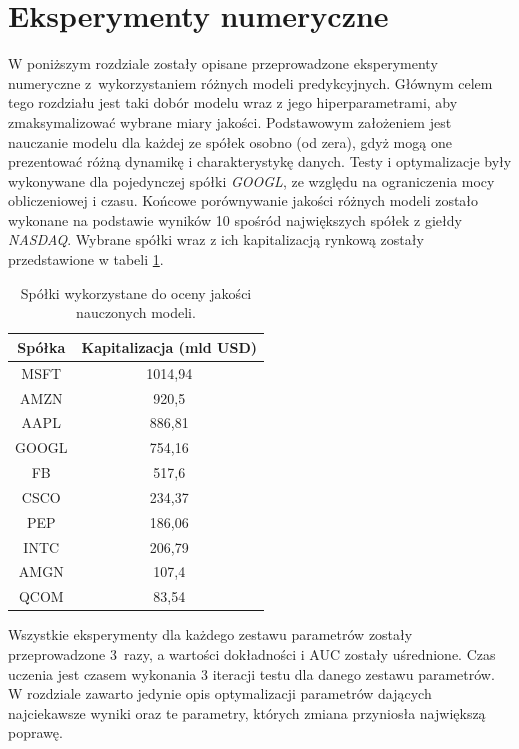 \documentclass[a4paper, twoside, 11pt, openright]{article}
\begin{document}
\bigskip

\newpage

\section{Eksperymenty numeryczne}

W poniższym rozdziale zostały opisane przeprowadzone eksperymenty numeryczne z~wykorzystaniem różnych modeli predykcyjnych. Głównym celem tego rozdziału jest taki dobór modelu wraz z jego hiperparametrami, aby zmaksymalizować wybrane miary jakości. Podstawowym założeniem jest nauczanie modelu dla każdej ze spółek osobno (od zera), gdyż mogą one prezentować różną dynamikę i charakterystykę danych. Testy i optymalizacje były wykonywane dla pojedynczej spółki \textit{GOOGL}, ze względu na ograniczenia mocy obliczeniowej i czasu. Końcowe porównywanie jakości różnych modeli zostało wykonane na podstawie wyników 10 spośród największych spółek z giełdy \textit{NASDAQ}. Wybrane spółki wraz z ich kapitalizacją rynkową zostały przedstawione w tabeli \ref{tab:biggest_companies}.


\begin{table}[H]
    \centering
    \begin{tabular}{|c|c|}
    \hline
        \textbf{Spółka} & \textbf{Kapitalizacja (mld USD)} \\ \hline
        MSFT & 1014,94 \\ \hline 
        AMZN & 920,5 \\ \hline 
        AAPL & 886,81 \\ \hline 
        GOOGL & 754,16 \\ \hline 
        FB & 517,6 \\ \hline 
        CSCO & 234,37 \\ \hline 
        PEP & 186,06 \\ \hline 
        INTC & 206,79 \\ \hline 
        AMGN & 107,4 \\ \hline 
        QCOM & 83,54 \\ \hline 
    \end{tabular}
    \caption{Spółki wykorzystane do oceny jakości nauczonych modeli.}
    \label{tab:biggest_companies}
\end{table}

Wszystkie eksperymenty dla każdego zestawu parametrów zostały przeprowadzone 3~razy, a wartości dokładności i AUC zostały uśrednione. Czas uczenia jest czasem wykonania 3 iteracji testu dla danego zestawu parametrów. W rozdziale zawarto jedynie opis optymalizacji parametrów dających najciekawsze wyniki oraz te parametry, których zmiana przyniosła największą poprawę.
\end{document}

